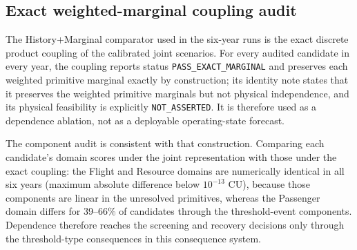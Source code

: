 \documentclass[10pt,a4paper]{article}
\numberwithin{equation}{section}
\begin{document}
\subsection{Exact weighted-marginal coupling audit}
\label{sup:marginal_audit}
The History+Marginal comparator used in the six-year runs is the exact discrete product coupling of the calibrated joint scenarios. For every audited candidate in every year, the coupling reports status \texttt{PASS\_EXACT\_MARGINAL} and preserves each weighted primitive marginal exactly by construction; its identity note states that it preserves the weighted primitive marginals but not physical independence, and its physical feasibility is explicitly \texttt{NOT\_ASSERTED}. It is therefore used as a dependence ablation, not as a deployable operating-state forecast.

The component audit is consistent with that construction. Comparing each candidate's domain scores under the joint representation with those under the exact coupling: the Flight and Resource domains are numerically identical in all six years (maximum absolute difference below $10^{-13}$ CU), because those components are linear in the unresolved primitives, whereas the Passenger domain differs for 39--66\% of candidates through the threshold-event components. Dependence therefore reaches the screening and recovery decisions only through the threshold-type consequences in this consequence system.
\end{document}
